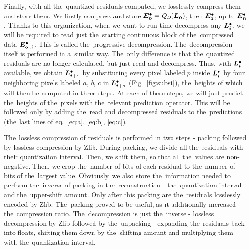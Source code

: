  Finally, with all the~quantized residuals computed, we losslessly compress them and store them. We firstly compress and store $\objdot{E}{0} = \opnorm{Q}{D}(\lnorm{0})$, then $\objdot{E}{1}$, up to $\objdot{E}{n}$. Thanks to this organization, when we want to run-time decompress any $\ldot{i}$, we will be required to read just the~starting continuous block of the~compressed data $\objdot{E}{0..i}$. This is called the~progressive decompression. The~decompression itself is performed in a~similar way. The~only difference is that the~quantized residuals are no longer calculated, but just read and decompress. Thus, with $\ldot{i}$ available, we obtain $\ldot{i+1}$ by substituting every pixel labeled $p$ inside $\ldot{i}$ by four neighboring pixels labeled $a$, $b$, $c$ in $\ldot{i+1}$ (Fig.~\ref{fig:subst}), the~heights of which will then be computed in three steps. At each of these steps, we will just predict the~heights of the~pixels with the~relevant prediction operator. This will be followed only by adding the~read and decompressed residuals  to the~predictions (the~last lines of eq.~\ref{eq:a}, \ref{eq:b}, \ref{eq:c}).
 
  The~lossless compression of residuals is performed in two steps - packing followed by lossless compression by Zlib. During packing, we divide all the~residuals with their quantization interval. Then, we shift them, so that all the~values are non-negative. Then, we crop the~number of bits of each residual to the~number of bits of the~largest value. Obviously, we also store the~information needed to perform the~inverse of packing in the~reconstruction - the~quantization interval and the~upper-shift amount. Only after this packing are the~residuals losslessly encoded by Zlib. The~packing proved to be useful, as it additionally increased the~compression ratio. The~decompression is just the~inverse - lossless decompression by Zlib followed by the~unpacking - expanding the~residuals back into floats, shifting them down by the~shifting amount and multiplying them with the~quantization interval.
